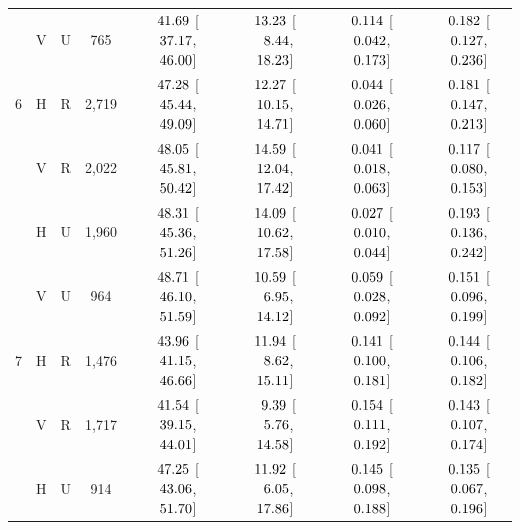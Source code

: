 \begin{landscape}
\begin{longtable}{lccccccc}
 & V & U & 765 & $\hphantom{-}41.69$ [$\hphantom{-}37.17$, $\hphantom{-}46.00$] & $\hphantom{-}13.23$ [$\hphantom{-}\hphantom{0}8.44$, $\hphantom{-}18.23$] & $\hphantom{-}0.114$ [$\hphantom{-}0.042$, $\hphantom{-}0.173$] & $\hphantom{-}0.182$ [$\hphantom{-}0.127$, $\hphantom{-}0.236$] \\
6 & H & R & 2,719 & $\hphantom{-}47.28$ [$\hphantom{-}45.44$, $\hphantom{-}49.09$] & $\hphantom{-}12.27$ [$\hphantom{-}10.15$, $\hphantom{-}14.71$] & $\hphantom{-}0.044$ [$\hphantom{-}0.026$, $\hphantom{-}0.060$] & $\hphantom{-}0.181$ [$\hphantom{-}0.147$, $\hphantom{-}0.213$] \\
 & V & R & 2,022 & $\hphantom{-}48.05$ [$\hphantom{-}45.81$, $\hphantom{-}50.42$] & $\hphantom{-}14.59$ [$\hphantom{-}12.04$, $\hphantom{-}17.42$] & $\hphantom{-}0.041$ [$\hphantom{-}0.018$, $\hphantom{-}0.063$] & $\hphantom{-}0.117$ [$\hphantom{-}0.080$, $\hphantom{-}0.153$] \\
 & H & U & 1,960 & $\hphantom{-}48.31$ [$\hphantom{-}45.36$, $\hphantom{-}51.26$] & $\hphantom{-}14.09$ [$\hphantom{-}10.62$, $\hphantom{-}17.58$] & $\hphantom{-}0.027$ [$\hphantom{-}0.010$, $\hphantom{-}0.044$] & $\hphantom{-}0.193$ [$\hphantom{-}0.136$, $\hphantom{-}0.242$] \\
 & V & U & 964 & $\hphantom{-}48.71$ [$\hphantom{-}46.10$, $\hphantom{-}51.59$] & $\hphantom{-}10.59$ [$\hphantom{-}\hphantom{0}6.95$, $\hphantom{-}14.12$] & $\hphantom{-}0.059$ [$\hphantom{-}0.028$, $\hphantom{-}0.092$] & $\hphantom{-}0.151$ [$\hphantom{-}0.096$, $\hphantom{-}0.199$] \\
7 & H & R & 1,476 & $\hphantom{-}43.96$ [$\hphantom{-}41.15$, $\hphantom{-}46.66$] & $\hphantom{-}11.94$ [$\hphantom{-}\hphantom{0}8.62$, $\hphantom{-}15.11$] & $\hphantom{-}0.141$ [$\hphantom{-}0.100$, $\hphantom{-}0.181$] & $\hphantom{-}0.144$ [$\hphantom{-}0.106$, $\hphantom{-}0.182$] \\
 & V & R & 1,717 & $\hphantom{-}41.54$ [$\hphantom{-}39.15$, $\hphantom{-}44.01$] & $\hphantom{-}\hphantom{0}9.39$ [$\hphantom{-}\hphantom{0}5.76$, $\hphantom{-}14.58$] & $\hphantom{-}0.154$ [$\hphantom{-}0.111$, $\hphantom{-}0.192$] & $\hphantom{-}0.143$ [$\hphantom{-}0.107$, $\hphantom{-}0.174$] \\
 & H & U & 914 & $\hphantom{-}47.25$ [$\hphantom{-}43.06$, $\hphantom{-}51.70$] & $\hphantom{-}11.92$ [$\hphantom{-}\hphantom{0}6.05$, $\hphantom{-}17.86$] & $\hphantom{-}0.145$ [$\hphantom{-}0.098$, $\hphantom{-}0.188$] & $\hphantom{-}0.135$ [$\hphantom{-}0.067$, $\hphantom{-}0.196$] \\

\end{longtable}
\end{landscape}
